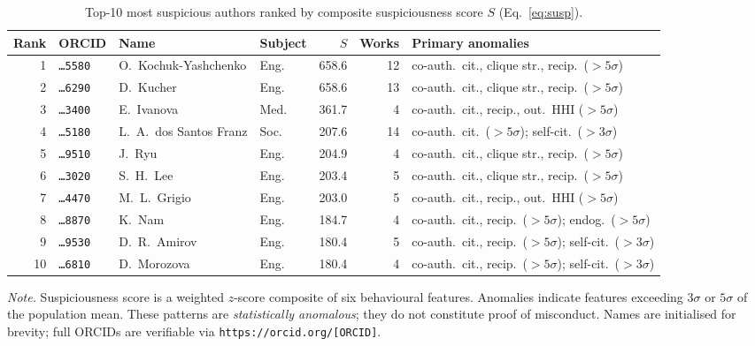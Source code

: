 \begin{table}[t]
\centering
\caption{Top-10 most suspicious authors ranked by composite
  suspiciousness score $S$ (Eq.~\ref{eq:susp}).}
\label{tab:suspicious-top10}
\small
\begin{tabular}{rl l l r r l}
\toprule
Rank & ORCID & Name & Subject & $S$ & Works & Primary anomalies \\
\midrule
  1 & \texttt{\dots5580} & O.\ Kochuk-Yashchenko    & Eng.  & 658.6 & 12 & co-auth.\ cit., clique str., recip.\ ($>5\sigma$) \\
  2 & \texttt{\dots6290} & D.\ Kucher               & Eng.  & 658.6 & 13 & co-auth.\ cit., clique str., recip.\ ($>5\sigma$) \\
  3 & \texttt{\dots3400} & E.\ Ivanova              & Med.  & 361.7 &  4 & co-auth.\ cit., recip., out.\ HHI ($>5\sigma$) \\
  4 & \texttt{\dots5180} & L.\ A.\ dos Santos Franz & Soc.  & 207.6 & 14 & co-auth.\ cit.\ ($>5\sigma$); self-cit.\ ($>3\sigma$) \\
  5 & \texttt{\dots9510} & J.\ Ryu                  & Eng.  & 204.9 &  4 & co-auth.\ cit., clique str., recip.\ ($>5\sigma$) \\
  6 & \texttt{\dots3020} & S.\ H.\ Lee              & Eng.  & 203.4 &  5 & co-auth.\ cit., clique str., recip.\ ($>5\sigma$) \\
  7 & \texttt{\dots4470} & M.\ L.\ Grigio           & Eng.  & 203.0 &  5 & co-auth.\ cit., recip., out.\ HHI ($>5\sigma$) \\
  8 & \texttt{\dots8870} & K.\ Nam                  & Eng.  & 184.7 &  4 & co-auth.\ cit., recip.\ ($>5\sigma$); endog.\ ($>5\sigma$) \\
  9 & \texttt{\dots9530} & D.\ R.\ Amirov           & Eng.  & 180.4 &  5 & co-auth.\ cit., recip.\ ($>5\sigma$); self-cit.\ ($>3\sigma$) \\
 10 & \texttt{\dots6810} & D.\ Morozova             & Eng.  & 180.4 &  4 & co-auth.\ cit., recip.\ ($>5\sigma$); self-cit.\ ($>3\sigma$) \\
\bottomrule
\end{tabular}

\medskip
{\footnotesize\textit{Note.}
  Suspiciousness score is a weighted $z$-score composite of six
  behavioural features.
  Anomalies indicate features exceeding $3\sigma$ or $5\sigma$
  of the population mean.
  These patterns are \emph{statistically anomalous}; they do not
  constitute proof of misconduct.
  Names are initialised for brevity; full ORCIDs are verifiable via
  \texttt{https://orcid.org/[ORCID]}.}
\end{table}

